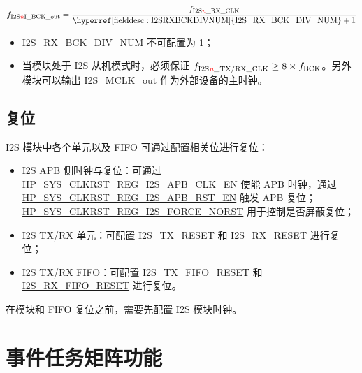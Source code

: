 \documentclass[main\_\_CN.tex]{subfiles}
\begin{document}
$$f_{\mathrm{I2S\regindex{n}I\_BCK\_out}} = \frac{f_{\mathrm{I2S\regindex{n}\_RX\_CLK}}}{\mathrm{\hyperref[fielddesc:I2SRXBCKDIVNUM]{I2S\_RX\_BCK\_DIV\_NUM}} + 1}$$

\begin{tiplisting}
\vspace{-2em}
\begin{itemize}
    \item \hyperref[fielddesc:I2SRXBCKDIVNUM]{I2S\_RX\_BCK\_DIV\_NUM} 不可配置为 1；
    \item 当模块处于 I2S 从机模式时，必须保证 $f_{\mathrm{I2S\regindex{n}\_TX/RX\_CLK}} \geq 8 \times f_{\mathrm{BCK}}$。另外模块可以输出 I2S\_MCLK\_out 作为外部设备的主时钟。
\end{itemize}
\end{tiplisting}

\subsection{复位} \label{sec:i2s-reset}

I2S 模块中各个单元以及 FIFO 可通过配置相关位进行复位：

\begin{itemize}
\item I2S APB 侧时钟与复位：可通过 \hyperref[fielddesc:HPSYSCLKRSTREGI2S0APBCLKEN]{HP\_SYS\_CLKRST\_REG\_I2S\_APB\_CLK\_EN} 使能 APB 时钟，通过 \hyperref[fielddesc:HPSYSCLKRSTREGI2S0APBRSTEN]{HP\_SYS\_CLKRST\_REG\_I2S\_APB\_RST\_EN} 触发 APB 复位；\hyperref[fielddesc:HPSYSCLKRSTREGI2S0FORCENORST]{HP\_SYS\_CLKRST\_REG\_I2S\_FORCE\_NORST} 用于控制是否屏蔽复位；
\item I2S TX/RX 单元：可配置 \hyperref[fielddesc:I2STXRESET]{I2S\_TX\_RESET} 和 \hyperref[fielddesc:I2SRXRESET]{I2S\_RX\_RESET} 进行复位；
\item I2S TX/RX FIFO：可配置 \hyperref[fielddesc:I2STXFIFORESET]{I2S\_TX\_FIFO\_RESET} 和 \hyperref[fielddesc:I2SRXFIFORESET]{I2S\_RX\_FIFO\_RESET} 进行复位。
\end{itemize}

\begin{tiplisting}
在模块和 FIFO 复位之前，需要先配置 I2S 模块时钟。
\end{tiplisting}

\section{事件任务矩阵功能} \label{sec:i2s-etm-func}
\end{document}
